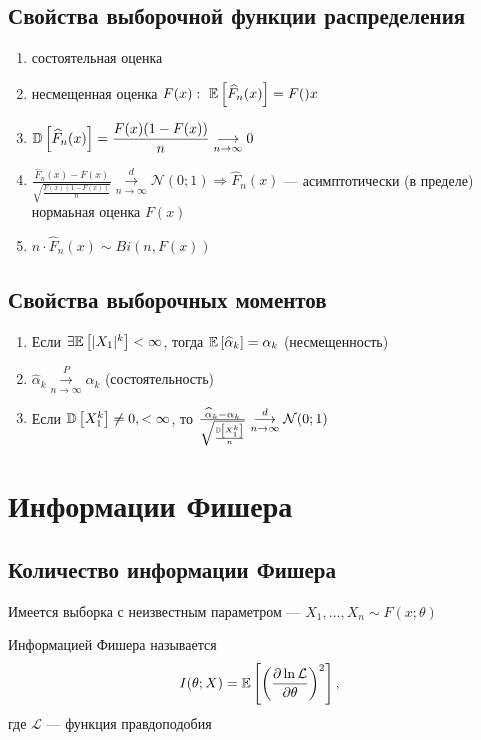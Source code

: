 \documentclass[a4paper, 10pt]{article}
\begin{document}
\subsection{Свойства выборочной функции распределения}
\begin{enumerate}
    \item состоятельная оценка
    \item несмещенная оценка $F(x):\ \matwait{\widehat{F}_n(x)}=F()x$
    \item $\mathbb{D}\left[\widehat{F}_n(x)\right]=\displaystyle\frac{F(x)(1-F(x))}{n}\underset{n\to\infty}{\longrightarrow}0$
    \item $\displaystyle\frac{\widehat{F}_n(x)-F(x)}{\sqrt{\displaystyle\frac{F(x)(1-F(x))}{n}}}\overset{d}{\underset{n\to\infty}{\longrightarrow}}\mathcal{N}(0;1)\Longrightarrow \widehat{F}_n(x)$ — асимптотически (в пределе) нормаьная оценка $F(x)$
    \item $n\cdot\widehat{F}_n(x)\sim Bi(n,F(x))$
\end{enumerate}

\subsection{Свойства выборочных моментов}
\theorem 
\begin{enumerate}
    \item Если $\exists \mathbb{E}\left[|X_1|^k\right]<\infty$, тогда $\mathbb{E}\left[\widehat{\alpha}_k\right]=\alpha_k$ (несмещенность)
    \item $\widehat{\alpha}_k\overset{P}{\underset{n\to\infty}{\longrightarrow}}\alpha_k$ (состоятельность)
    \item Если $\mathbb{D}\left[X_1^k\right]\ne0,<\infty$, то $\frac{\widehat{\alpha}_k-\alpha_k}{\sqrt{\frac{\mathbb{D}\left[X_1^k\right]}{n}}}\overset{d}{\underset{n\to\infty}{\longrightarrow}}\mathcal{N}(0;1)$
\end{enumerate}

\newpage
\section{Информации Фишера}
\subsection{Количество информации Фишера}
Имеется выборка с неизвестным параметром — $X_1,\ldots,X_n\sim F(x;\theta)$

 Информацией Фишера называется 
\begin{equation*}
    I(\theta;X)=\mathbb{E}\left[\left(\frac{\partial \ln\mathcal{L}}{\partial\theta}\right)^2\right],
\end{equation*}
где $\mathcal{L}$ — функция правдоподобия
\end{document}
